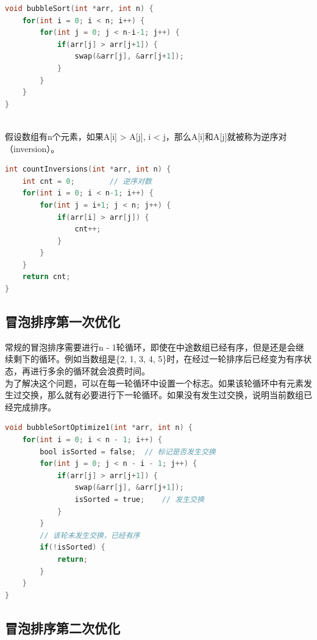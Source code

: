 
\begin{lstlisting}[language=C]
void bubbleSort(int *arr, int n) {
    for(int i = 0; i < n; i++) {
        for(int j = 0; j < n-i-1; j++) {
            if(arr[j] > arr[j+1]) {
                swap(&arr[j], &arr[j+1]);
            }
        }
    }
}
\end{lstlisting}

\vspace{0.5cm}

 \\

假设数组有n个元素，如果A[i] > A[j], i < j，那么A[i]和A[j]就被称为逆序对（inversion）。

\begin{lstlisting}[language=C]
int countInversions(int *arr, int n) {
    int cnt = 0;        // 逆序对数
    for(int i = 0; i < n-1; i++) {
        for(int j = i+1; j < n; j++) {
            if(arr[i] > arr[j]) {
                cnt++;
            }
        }
    }
    return cnt;
}
\end{lstlisting}

\subsection{冒泡排序第一次优化}

常规的冒泡排序需要进行n - 1轮循环，即使在中途数组已经有序，但是还是会继续剩下的循环。例如当数组是\{2, 1, 3, 4, 5\}时，在经过一轮排序后已经变为有序状态，再进行多余的循环就会浪费时间。 \\

为了解决这个问题，可以在每一轮循环中设置一个标志。如果该轮循环中有元素发生过交换，那么就有必要进行下一轮循环。如果没有发生过交换，说明当前数组已经完成排序。 \\


\begin{lstlisting}[language=C]
void bubbleSortOptimize1(int *arr, int n) {
    for(int i = 0; i < n - 1; i++) {
        bool isSorted = false;  // 标记是否发生交换
        for(int j = 0; j < n - i - 1; j++) {
            if(arr[j] > arr[j+1]) {
                swap(&arr[j], &arr[j+1]);
                isSorted = true;    // 发生交换
            }
        }
        // 该轮未发生交换，已经有序
        if(!isSorted) {
            return;
        }
    }
}
\end{lstlisting}

\subsection{冒泡排序第二次优化}

